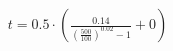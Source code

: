 \documentclass[preview]{standalone}
\begin{document}
\begin{align*}
t = 0.5 \cdot \left( \frac{0.14}{\left(\frac{500}{100}\right)^{0.02} - 1} + 0 \right)
\end{align*}
\end{document}
